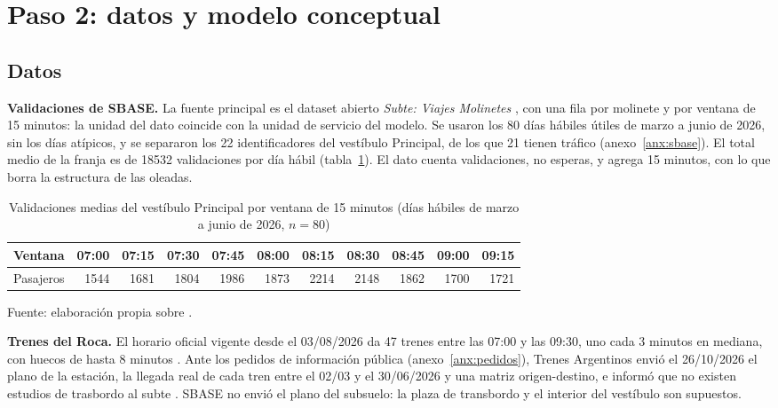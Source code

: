 \section{Paso 2: datos y modelo conceptual}
\label{sec:paso2-datos-modelo-conceptual}

\subsection{Datos}

\textbf{Validaciones de SBASE.} La fuente principal es el dataset abierto \emph{Subte: Viajes Molinetes}
\parencite{sbase2026molinetes}, con una fila por molinete y por ventana de 15 minutos: la unidad del dato
coincide con la unidad de servicio del modelo. Se usaron los 80 días hábiles útiles de marzo a junio de 2026,
sin los días atípicos, y se separaron los 22 identificadores del vestíbulo Principal, de los que 21 tienen
tráfico (anexo~\ref{anx:sbase}). El total medio de la franja es de \num{18532} validaciones por día hábil
(tabla~\ref{tab:perfil}). El dato cuenta validaciones, no esperas, y agrega 15 minutos, con lo que borra la
estructura de las oleadas.

\begin{table}[H]
\centering
\caption{Validaciones medias del vestíbulo Principal por ventana de 15 minutos (días hábiles de marzo a junio de 2026, $n = 80$)}
\label{tab:perfil}
\small
\begin{tabular}{@{}lrrrrrrrrrr@{}}
\toprule
Ventana & 07:00 & 07:15 & 07:30 & 07:45 & 08:00 & 08:15 & 08:30 & 08:45 & 09:00 & 09:15 \\
\midrule
Pasajeros & \num{1544} & \num{1681} & \num{1804} & \num{1986} & \num{1873} & \num{2214} & \num{2148} & \num{1862} & \num{1700} & \num{1721} \\
\bottomrule
\end{tabular}

\vspace{2pt}
{\footnotesize Fuente: elaboración propia sobre \textcite{sbase2026molinetes}.}
\end{table}

\textbf{Trenes del Roca.} El horario oficial vigente desde el 03/08/2026 da 47 trenes entre las 07:00 y las
09:30, uno cada 3 minutos en mediana, con huecos de hasta 8 minutos \parencite{trenes2026roca}. Ante los
pedidos de información pública (anexo~\ref{anx:pedidos}), Trenes Argentinos envió el 26/10/2026 el plano de la
estación, la llegada real de cada tren entre el 02/03 y el 30/06/2026 y una matriz origen-destino, e informó
que no existen estudios de trasbordo al subte \parencite{sofse2026nota}. SBASE no envió el plano del subsuelo:
la plaza de transbordo y el interior del vestíbulo son supuestos.

